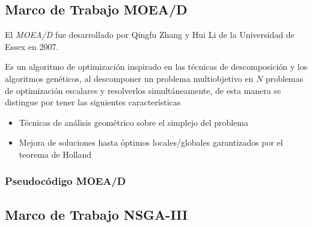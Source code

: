 \documentclass[letterpaper,10pt]{article}
\begin{document}
\subsection{Marco de Trabajo MOEA/D}
El \emph{MOEA/D} fue desarrollado por Qingfu Zhang y Hui Li de la Universidad de Essex en 2007. \cite{4358754}
 
Es un algoritmo de optimización inspirado en las técnicas de descomposición y los algoritmos genéticos, al descomponer un problema multiobjetivo en $N$ problemas de optimización escalares y resolverlos simultáneamente, de esta manera se distingue por tener las siguientes características
 \begin{itemize}
 \item Técnicas de análisis geométrico sobre el simplejo del problema \cite{mie99,Das:1998:NIN:588907.589322, Messac2003}
 \item Mejora de soluciones hasta óptimos locales/globales garantizados por el teorema de Holland\cite{Holland:1992:ANA:531075}
 \end{itemize}


\subsubsection{Pseudocódigo MOEA/D}


\subsection{Marco de Trabajo NSGA-III}
\end{document}
